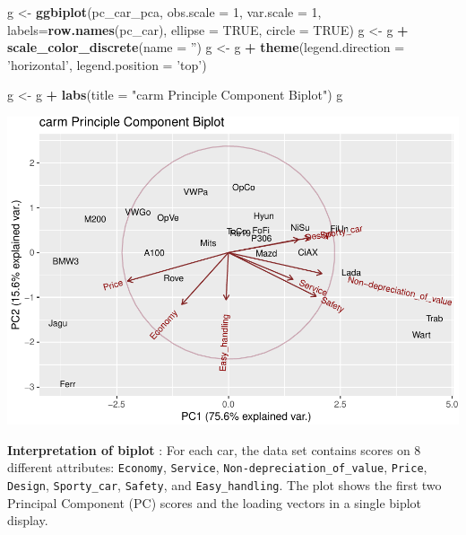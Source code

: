 \documentclass[]{article}
\newenvironment{Shaded}{\begin{snugshade}}{\end{snugshade}}
\newcommand{\KeywordTok}[1]{\textcolor[rgb]{0.13,0.29,0.53}{\textbf{#1}}}
\newcommand{\DataTypeTok}[1]{\textcolor[rgb]{0.13,0.29,0.53}{#1}}
\newcommand{\DecValTok}[1]{\textcolor[rgb]{0.00,0.00,0.81}{#1}}
\newcommand{\StringTok}[1]{\textcolor[rgb]{0.31,0.60,0.02}{#1}}
\newcommand{\OtherTok}[1]{\textcolor[rgb]{0.56,0.35,0.01}{#1}}
\newcommand{\OperatorTok}[1]{\textcolor[rgb]{0.81,0.36,0.00}{\textbf{#1}}}
\newcommand{\NormalTok}[1]{#1}
\begin{document}
\begin{Shaded}
\begin{Highlighting}[]
\NormalTok{g <-}\StringTok{ }\KeywordTok{ggbiplot}\NormalTok{(pc_car_pca, }\DataTypeTok{obs.scale =} \DecValTok{1}\NormalTok{, }\DataTypeTok{var.scale =} \DecValTok{1}\NormalTok{, }\DataTypeTok{labels=}\KeywordTok{row.names}\NormalTok{(pc_car),}
              \DataTypeTok{ellipse =} \OtherTok{TRUE}\NormalTok{, }
              \DataTypeTok{circle =} \OtherTok{TRUE}\NormalTok{)}
\NormalTok{g <-}\StringTok{ }\NormalTok{g }\OperatorTok{+}\StringTok{ }\KeywordTok{scale_color_discrete}\NormalTok{(}\DataTypeTok{name =} \StringTok{''}\NormalTok{)}
\NormalTok{g <-}\StringTok{ }\NormalTok{g }\OperatorTok{+}\StringTok{ }\KeywordTok{theme}\NormalTok{(}\DataTypeTok{legend.direction =} \StringTok{'horizontal'}\NormalTok{, }
               \DataTypeTok{legend.position =} \StringTok{'top'}\NormalTok{)}

\NormalTok{g <-}\StringTok{ }\NormalTok{g }\OperatorTok{+}\StringTok{ }\KeywordTok{labs}\NormalTok{(}\DataTypeTok{title =} \StringTok{"carm Principle Component Biplot"}\NormalTok{)}
\NormalTok{g}
\end{Highlighting}
\end{Shaded}

\begin{center}\includegraphics{Assignment_3_files/figure-latex/unnamed-chunk-8-1} \end{center}

\textbf{Interpretation of biplot} : For each car, the data set contains
scores on 8 different attributes: \texttt{Economy}, \texttt{Service},
\texttt{Non-depreciation\_of\_value}, \texttt{Price}, \texttt{Design},
\texttt{Sporty\_car}, \texttt{Safety}, and \texttt{Easy\_handling}. The
plot shows the first two Principal Component (PC) scores and the loading
vectors in a single biplot display.
\end{document}
